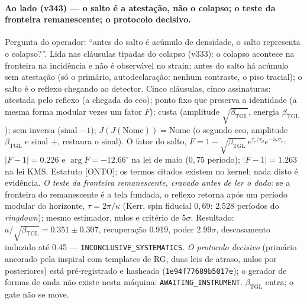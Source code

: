 \documentclass[11pt]{article}
\newcommand{\bTGL}{\beta_{\mathrm{TGL}}}\newcommand{\Msun}{M_{\odot}}\newcommand{\TGL}{\mathrm{TGL}}
\theoremstyle{definition}\newtheorem{deriv}{Derivação}
\begin{document}
\paragraph*{Ao lado (v343) --- o salto é a atestação, não o colapso; o teste da fronteira remanescente; o protocolo decisivo.} Pergunta do operador: ``antes do salto é acúmulo de densidade, o salto representa o colapso?''. Lida nas cláusulas tipadas do colapso (v333): o colapso acontece na fronteira na incidência e não é observável no strain; antes do salto há acúmulo sem atestação (só o primário, autodeclaração: nenhum contraste, o piso tracial); o salto é o reflexo chegando ao detector. Cinco cláusulas, cinco assinaturas: atestada pelo reflexo (a chegada do eco); ponto fixo que preserva a identidade (a mesma forma modular vezes um fator $F$); custa (amplitude $\sqrt{\bTGL}$, energia $\bTGL$); sem inversa (sinal $-1$); $J(J(\mathrm{Nome}))=\mathrm{Nome}$ (o segundo eco, amplitude $\bTGL$ e sinal $+$, restaura o sinal). O fator do salto, $F=1-\sqrt{\bTGL}\,e^{\tau_e/\tau_d}e^{-i\omega\tau_e}$: $|F-1|=0.226$ e $\arg F=-12.66^\circ$ na lei de maio ($0{,}75$ período); $|F-1|=1.263$ na lei KMS. Estatuto [ONTO]; os termos citados existem no kernel; nada disto é evidência. \emph{O teste da fronteira remanescente, cravado antes de ler o dado:} se a fronteira do remanescente é a tela fundada, o reflexo retorna após um período modular do horizonte, $\tau=2\pi/\kappa$ (Kerr, spin fiducial $0{,}69$: $2.528$ períodos do \emph{ringdown}); mesmo estimador, nulos e critério de $5\sigma$. Resultado: $a/\sqrt{\bTGL}=0.351\pm0.307$, recuperação 0.919, poder 2.99$\sigma$, descasamento induzido até 0.45 --- \texttt{INCONCLUSIVE\_SYSTEMATICS}. \emph{O protocolo decisivo} (primário ancorado pela inspiral com templates de RG, duas leis de atraso, nulos por posteriores) está pré-registrado e hasheado (\texttt{1e94f77689b5017e}); o gerador de formas de onda não existe nesta máquina: \texttt{AWAITING\_INSTRUMENT}. $\bTGL$ entra; o gate não se move.
\end{document}
